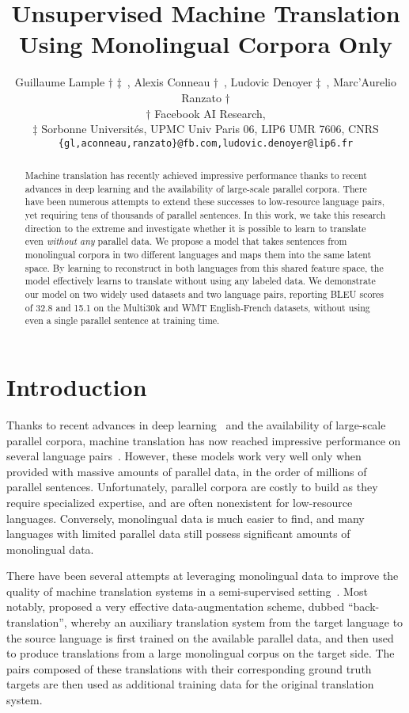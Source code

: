 \documentclass{article} \usepackage{iclr2018_conference,times}
\title{Unsupervised Machine Translation \\ Using Monolingual Corpora Only}
\author{Guillaume Lample $\dagger$ $\ddagger$~, Alexis Conneau $\dagger$~, Ludovic Denoyer $\ddagger$~, Marc'Aurelio Ranzato $\dagger$\\
	$\dagger$ Facebook AI Research,\\
	$\ddagger$ Sorbonne Universit\'es, UPMC Univ Paris 06, LIP6 UMR 7606, CNRS \\
	\texttt{\{gl,aconneau,ranzato\}@fb.com,ludovic.denoyer@lip6.fr} \\
}
\begin{document}
\maketitle

 \begin{abstract}
Machine translation has recently achieved impressive performance thanks to recent advances in deep learning and the availability of large-scale parallel corpora. There have been numerous attempts to extend these successes to low-resource language pairs, yet requiring tens of thousands of parallel sentences. In this work, we take this research direction to the extreme and investigate whether it is possible to learn to translate even \textit{without any} parallel data. We propose a model that takes sentences from monolingual corpora in two different languages and maps them into the same latent space. By learning to reconstruct in both languages from this shared feature space, the model effectively learns to translate without using any labeled data. We demonstrate our model on two widely used datasets and two language pairs, reporting BLEU scores of 32.8 and 15.1 on the Multi30k and WMT English-French datasets, without using even a single parallel sentence at training time.
\end{abstract}
  
\section{Introduction}
\label{sec:introduction}
Thanks to recent advances in deep learning~\citep{sutskever2014sequence, attentionNMT} and the availability
of large-scale parallel corpora, machine translation has now reached impressive performance on several language pairs~\citep{wu2016google}. However, these models work very well only when provided with massive amounts of parallel data, in the order of millions of parallel sentences. Unfortunately, parallel corpora are costly to build as they require specialized expertise, and are often nonexistent for low-resource languages. Conversely, monolingual data is much easier to find, and many languages with limited parallel data still possess significant amounts of monolingual data.

There have been several attempts at leveraging monolingual data to improve the quality of machine translation systems in a semi-supervised setting~\citep{marcu04,irvine13,irvine15,zheng17}. Most notably,  \citet{sennrich2015improving} proposed a very effective data-augmentation scheme, dubbed ``back-translation'',
whereby an auxiliary translation system from the target language to the source language is first trained on the available parallel data, and then used to produce translations from a large monolingual corpus on the target side. The pairs composed of these translations with their corresponding ground truth targets are then used as additional training data for the original translation system. 
\end{document}
